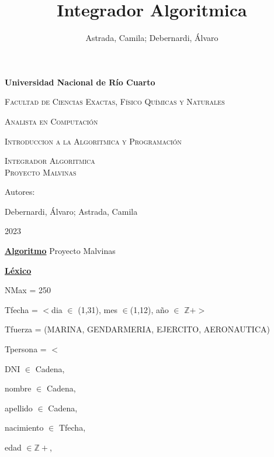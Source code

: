 \documentclass{article}
\title{Integrador Algoritmica}
\author{Astrada, Camila; Debernardi, Álvaro}
\begin{document}
    \begin{titlepage}
        \centering
        {\bfseries\LARGE Universidad Nacional de Río Cuarto \par}
        \vspace{1cm}
        {\scshape\Large Facultad de Ciencias Exactas, Físico Químicas y Naturales \par}
        {\scshape\Large Analista en Computación \par}
        {\scshape\Large Introduccion a la Algoritmica y Programación\par}
        \vspace{3cm}
        {\scshape\Huge Integrador Algoritmica \\ Proyecto Malvinas\par}
        \vspace{3cm}
        \vfill
        {\Large Autores: \par}
        {\Large Debernardi, Álvaro; Astrada, Camila\par}
        \vfill
        {\Large 2023 \par} 
    \end{titlepage}

    \underline{\textbf{Algoritmo}} Proyecto Malvinas

    \underline{\textbf{Léxico}}

    \hspace{4mm}NMax = 250

    \hspace{4mm}Tfecha = $<$dia $\in$ (1,31), mes $\in$(1,12), año $\in$ $\mathbb{Z}+>$

    \hspace{4mm}Tfuerza = (MARINA, GENDARMERIA, EJERCITO, AERONAUTICA)

    \hspace{4mm}Tpersona = $<$
    
        \hspace{8mm}DNI $\in$ Cadena, 
        
        \hspace{8mm}nombre $\in$ Cadena, 
        
        \hspace{8mm}apellido $\in$ Cadena, 
        
        \hspace{8mm}nacimiento $\in$ Tfecha, 
        
        \hspace{8mm}edad $\in \mathbb{Z}+$, 
        
\end{document}
